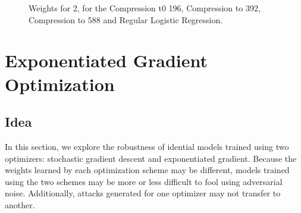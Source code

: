 \documentclass{asaproc}
\begin{document}
\begin{figure}[h!]
	\centering
	\caption{\enspace Weights for 2, for the Compression t0 196, Compression to 392, Compression to 588 and Regular Logistic Regression.}
	\label{fig5} 
\end{figure}

\section*{Exponentiated Gradient Optimization}

\subsection*{Idea}

In this section, we explore the robustness of idential models trained using two optimizers: stochastic gradient descent and exponentiated gradient. Because the weights learned by each optimization scheme may be different, models trained using the two schemes may be more or less difficult to fool using adversarial noise. Additionally, attacks generated for one optimizer may not transfer to another.
\end{document}
